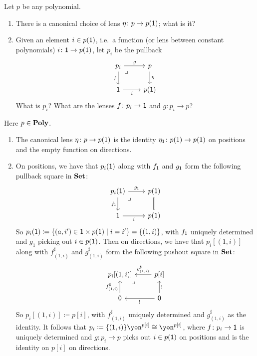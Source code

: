 \documentclass[Book-Poly]{subfiles}
\begin{document}
\begin{exercise}
Let $p$ be any polynomial.
\begin{enumerate}
	\item There is a canonical choice of lens $\eta\colon p\to p(\textsf{1})$; what is it?
	\item Given an element $i\in p(\textsf{1})$, i.e.\ a function (or lens between constant polynomials) $i\colon\textsf{1}\to p(\textsf{1})$, let $p_i$ be the pullback
	\[
	\begin{tikzcd}
	p_i\ar[r, "g"]\ar[d, "f"']&
	p\ar[d, "\eta"]\\
	\1\ar[r, "i"']&
	p(\1)\ar[ul, phantom, very near end, "\lrcorner"]
	\end{tikzcd}
	\]
	What is $p_i$? What are the lenses $f \colon p_i \to \textsf{1}$ and $g \colon p_i \to p$? \qedhere
\end{enumerate}
\begin{solution}
Here $p \in \mathbf{Poly}$.
\begin{enumerate}
    \item The canonical lens $\eta \colon p \to p(\textsf{1})$ is the identity $\eta_{\textsf{1}} \colon p(\textsf{1}) \to p(\textsf{1})$ on positions and the empty function on directions.

    \item On positions, we have that $p_i(\textsf{1})$ along with $f_{\textsf{1}}$ and $g_{\textsf{1}}$ form the following pullback square in $\mathbf{Set}$:
    \[
	\begin{tikzcd}
    	p_i(\1) \ar[r, "g_\1"] \ar[d, "f_\1"'] &
    	p(\1) \ar[d, equals] \\
    	\1 \ar[r, "i"'] &
    	p(\1) \ar[ul, phantom, very near end, "\lrcorner"]
	\end{tikzcd}
	\]
	So $p_i(\textsf{1}) \coloneqq \{(a, i') \in \textsf{1} \times p(\textsf{1}) \mid i = i' \} = \{(1, i)\}$, with $f_{\textsf{1}}$ uniquely determined and $g_1$ picking out $i \in p(\textsf{1})$.
	Then on directions, we have that $p_i[(1,i)]$ along with $f^\sharp_{(1,i)}$ and $g^\sharp_{(1,i)}$ form the following pushout square in $\mathbf{Set}$:
	\[
	\begin{tikzcd}
    	p_i[(1,i)] \ar[from=r, "g^\sharp_{(1,i)}"'] \ar[from=d, "f^\sharp_{(1,i)}"] &
    	p[i] \ar[from=d, "!"'] \\
    	\0 \ar[from=r, "!"] &
    	\0 \ar[ul, phantom, very near end, "\lrcorner"]
    \end{tikzcd}
    \]
    So $p_i[(1,i)] \coloneqq p[i]$, with $f^\sharp_{(1,i)}$ uniquely determined and $g^\sharp_{(1,i)}$ as the identity.
    It follows that $p_i \coloneqq \{(1,i)\}\yon^{p[i]} \iso \yon^{p[i]}$, where $f \colon p_i \to \textsf{1}$ is uniquely determined and $g \colon p_i \to p$ picks out $i \in p(\textsf{1})$ on positions and is the identity on $p[i]$ on directions.
\end{enumerate}
\end{solution}
\end{exercise}
\end{document}
